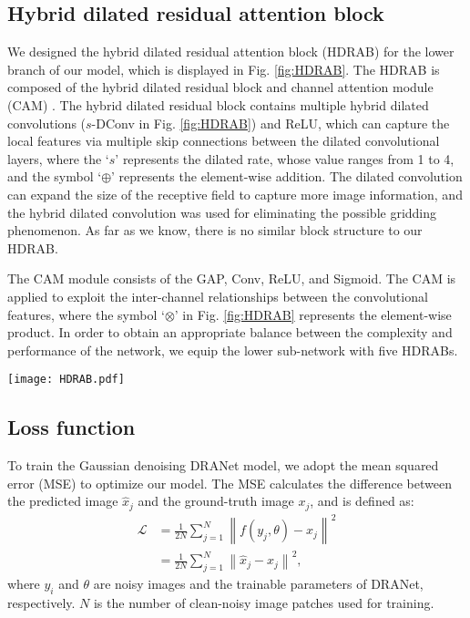 \documentclass[3p,times]{elsarticle}
\begin{document}
\subsection{Hybrid dilated residual attention block}
We designed the hybrid dilated residual attention block (HDRAB) for the lower branch of our model, which is displayed in Fig. \ref{fig:HDRAB}. The HDRAB is composed of the hybrid dilated residual block and channel attention module (CAM) \cite{Hu2018}. The hybrid dilated residual block contains multiple hybrid dilated convolutions ($s$-DConv in Fig. \ref{fig:HDRAB}) \cite{Yu2015} and ReLU, which can capture the local features via multiple skip connections between the dilated convolutional layers, where the `$s$' represents the dilated rate, whose value ranges from 1 to 4, and the symbol `$\oplus$' represents the element-wise addition. The dilated convolution can expand the size of the receptive field to capture more image information, and the hybrid dilated convolution \cite{Wang2018} was used for eliminating the possible gridding phenomenon. As far as we know, there is no similar block structure to our HDRAB.

The CAM module consists of the GAP, Conv, ReLU, and Sigmoid. The CAM is applied to exploit the inter-channel relationships between the convolutional features, where the symbol `$\otimes$' in Fig. \ref{fig:HDRAB} represents the element-wise product. In order to obtain an appropriate balance between the complexity and performance of the network, we equip the lower sub-network with five HDRABs.

\begin{figure*}[htbp]
	\begin{center}
		\texttt{[image: HDRAB.pdf]}
		\caption{The architecture of the hybrid dilated residual attention block (HDRAB).}
		\label{fig:HDRAB}
	\end{center}
\end{figure*}

\subsection{Loss function}
To train the Gaussian denoising DRANet model, we adopt the mean squared error (MSE) to optimize our model. The MSE calculates the difference between the predicted image $\hat{x}_j$ and the ground-truth image $x_j$, and is defined as:
\begin{equation}
\begin{aligned}
\mathcal{L} &= \frac{1}{2N} \sum_{j=1}^N \left\|f(y_j, \theta)- x_j\right\|^2\\
            &= \frac{1}{2N} \sum_{j=1}^N \left\|\hat{x}_j - x_j\right\|^2,
\end{aligned}
\end{equation}
\noindent where $y_i$ and $\theta$ are noisy images and the trainable parameters of DRANet, respectively. $N$ is the number of clean-noisy image patches used for training.
\end{document}
